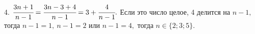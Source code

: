 4. $\cfrac{3n+1}{n-1}=\cfrac{3n-3+4}{n-1}=3+\cfrac{4}{n-1}.$ Если это число целое, 4 делится на $n-1,$ тогда $n-1=1,\ n-1=2$ или $n-1=4,$
тогда $n\in\{2; 3; 5\}.$\\

